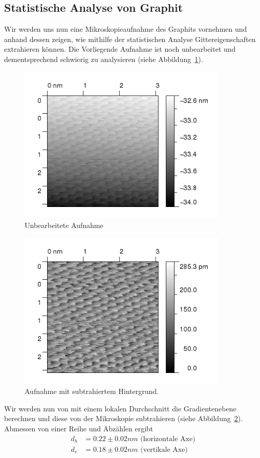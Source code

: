 \clearpage
\subsection{Statistische Analyse von Graphit}
Wir werden uns nun eine Mikroskopieaufnahme des Graphits vornehmen und anhand dessen zeigen,
wie mithilfe der statistischen Analyse Gittereigenschaften extrahieren können. 
Die Vorliegende Aufnahme ist noch unbearbeitet
und dementsprechend schwierig zu analysieren (siehe Abbildung~\ref{fig:fourier1}).

\begin{figure}  
    \includegraphics[width=10cm]{pics/fourier1}
  \caption{Unbearbeitete Aufnahme}
\label{fig:fourier1}
\end{figure}
\begin{figure}  
    \includegraphics[width=10cm]{pics/fourier2}
  \caption{Aufnahme mit subtrahiertem Hintergrund.}
\label{fig:fourier2}
\end{figure}


Wir werden nun von mit einem lokalen Durchschnitt die Gradientenebene berechnen und diese
von der Mikroskopie subtrahieren (siehe Abbildung~\ref{fig:fourier2}). 
Abmessen von einer Reihe und Abzählen ergibt
\begin{align*}
    d_h &= 0.22 \pm 0.02 nm \mbox{ (horizontale Axe)}\\
    d_v &= 0.18 \pm 0.02 nm \mbox{ (vertikale Axe)}
\end{align*}


